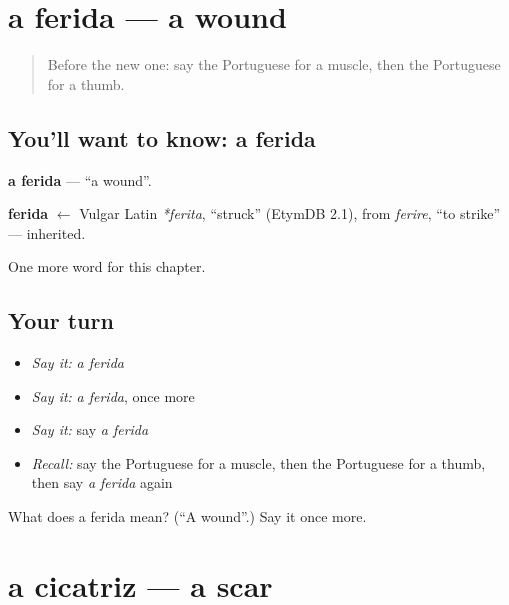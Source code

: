 \section[a ferida]{a ferida — a wound}

\label{lesson:PT-C180-ferida}



\begin{quote}
Before the new one: say the Portuguese for a muscle, then the Portuguese for a thumb.
\end{quote}

\subsection*{You'll want to know: a ferida}
\textbf{a ferida} — \textquotedblleft{}a wound\textquotedblright{}.

\begin{cousinweb}
\textbf{ferida} $\leftarrow$ Vulgar Latin \emph{*ferita}, \textquotedblleft{}struck\textquotedblright{} (EtymDB 2.1), from \emph{ferire}, \textquotedblleft{}to strike\textquotedblright{} — inherited.
\end{cousinweb}

\begin{grammarlens}[title={What you've built}]
One more word for this chapter.
\end{grammarlens}

\subsection*{Your turn}
\begin{itemize}
\raggedright
  \item \emph{Say it:} \emph{a ferida}
  \item \emph{Say it:} \emph{a ferida}, once more
  \item \emph{Say it:} say \emph{a ferida}
  \item \emph{Recall:} say the Portuguese for a muscle, then the Portuguese for a thumb, then say \emph{a ferida} again
\end{itemize}

\begin{tcolorbox}[breakable,colback=teal!4,colframe=teal!35!black,title={Before you move on}]
What does a ferida mean? (\textquotedblleft{}A wound\textquotedblright{}.) Say it once more.
\end{tcolorbox}
\section[a cicatriz]{a cicatriz — a scar}

